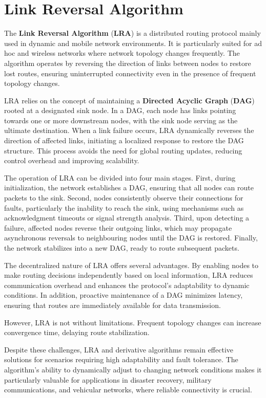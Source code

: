 \documentclass[../report.tex]{subfiles}
\begin{document}
\section{Link Reversal Algorithm}
The \textbf{Link Reversal Algorithm} (\textbf{LRA}\cite{gafni1981distributed}) is a distributed routing protocol mainly used in dynamic and mobile network environments. It is particularly suited for ad hoc and wireless networks where network topology changes frequently. The algorithm operates by reversing the direction of links between nodes to restore lost routes, ensuring uninterrupted connectivity even in the presence of frequent topology changes.

LRA relies on the concept of maintaining a \textbf{Directed Acyclic Graph} (\textbf{DAG}) rooted at a designated sink node. In a DAG, each node has links pointing towards one or more downstream nodes, with the sink node serving as the ultimate destination. When a link failure occurs, LRA dynamically reverses the direction of affected links, initiating a localized response to restore the DAG structure. This process avoids the need for global routing updates, reducing control overhead and improving scalability.

The operation of LRA can be divided into four main stages. First, during initialization, the network establishes a DAG, ensuring that all nodes can route packets to the sink. Second, nodes consistently observe their connections for faults, particularly the inability to reach the sink, using mechanisms such as acknowledgment timeouts or signal strength analysis. Third, upon detecting a failure, affected nodes reverse their outgoing links, which may propagate asynchronous reversals to neighbouring nodes until the DAG is restored. Finally, the network stabilizes into a new DAG, ready to route subsequent packets.

The decentralized nature of LRA offers several advantages. By enabling nodes to make routing decisions independently based on local information, LRA reduces communication overhead and enhances the protocol’s adaptability to dynamic conditions. In addition, proactive maintenance of a DAG minimizes latency, ensuring that routes are immediately available for data transmission.

However, LRA is not without limitations. Frequent topology changes can increase convergence time, delaying route stabilization. 

Despite these challenges, LRA and derivative algorithms remain effective solutions for scenarios requiring high adaptability and fault tolerance. The algorithm’s ability to dynamically adjust to changing network conditions makes it particularly valuable for applications in disaster recovery, military communications, and vehicular networks, where reliable connectivity is crucial.
\end{document}
